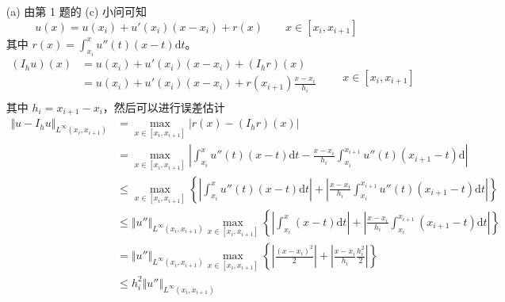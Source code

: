 \documentclass[a4paper]{article}
\begin{document}
\begin{enumerate}
    \item[(a)] 由第 1 题的 (c) 小问可知
            \begin{equation}
                u(x) = u(x_i) + u'(x_i)(x-x_i) + r(x)
                \qquad x\in [x_i, x_{i+1}]
            \end{equation}
            其中 $r(x)=\int_{x_i}^{x}u''(t)(x-t)\text{d}t$。
            \begin{equation}
                \begin{aligned}
                    (I_h u)(x) &= u(x_i) + u'(x_i)(x-x_i) + (I_h r)(x)\\
                               &= u(x_i) + u'(x_i)(x-x_i) + r(x_{i+1})\frac{x-x_i}{h_i}\\
                \end{aligned}
                \qquad x\in [x_i, x_{i+1}]
            \end{equation}
            其中 $h_i=x_{i+1}-x_i$，然后可以进行误差估计
            \begin{equation}
                \begin{aligned}
                    \Vert u-I_h u \Vert_{L^{\infty}(x_i,x_{i+1})} 
                    &= \max_{x\in [x_i,x_{i+1}]}|r(x)- (I_h r)(x)|\\
                    &= \max_{x\in [x_i,x_{i+1}]}\left|\int_{x_i}^{x}u''(t)(x-t)\text{d}t
                    -\frac{x-x_i}{h_i}\int_{x_i}^{x_{i+1}}u''(t)(x_{i+1}-t)\text{d}
                    \right|\\
                    &\leq \max_{x\in [x_i,x_{i+1}]}\left\{
                        \left|\int_{x_i}^{x}u''(t)(x-t)\text{d}t\right|
                        +\left|\frac{x-x_i}{h_i}\int_{x_i}^{x_{i+1}}
                        {u''(t)(x_{i+1}-t)\text{d}t}\right|
                    \right\}\\
                    &\leq \Vert u''\Vert_{L^{\infty}(x_i,x_{i+1})} \max_{x\in [x_i,x_{i+1}]}\left\{
                        \left|\int_{x_i}^{x}(x-t)\text{d}t\right|
                        +\left|\frac{x-x_i}{h_i}\int_{x_i}^{x_{i+1}}
                        {(x_{i+1}-t)\text{d}t}\right|
                    \right\}\\
                    &=\Vert u''\Vert_{L^{\infty}(x_i,x_{i+1})} \max_{x\in [x_i,x_{i+1}]}\left\{
                        \left|\frac{(x-x_i)^2}{2}\right|
                        +\left|\frac{x-x_i}{h_i}\frac{h_i^2}{2}\right|
                    \right\}\\
                    &\leq h_i^2 \Vert u''\Vert_{L^{\infty}(x_i,x_{i+1})}

\end{aligned}
\end{equation}
\end{enumerate}
\end{document}
